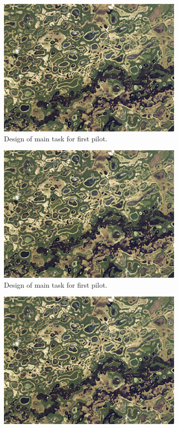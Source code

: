 \begin{figure}[!htb]
\begin{subfigure}{0.5\textwidth}
  \centering
  \includegraphics[width=.8\linewidth]{pantanal.jpeg}  
  \caption{Design of main task for first pilot.}
  \label{v2.requirement.examples.1}
\end{subfigure}
\begin{subfigure}{0.5\textwidth}
  \centering
  \includegraphics[width=.8\linewidth]{pantanal.jpeg}  
  \caption{Design of main task for first pilot.}
  \label{v2.requirement.examples.2}
\end{subfigure}
\newline
\begin{subfigure}{0.5\textwidth}
  \centering
  \includegraphics[width=.8\linewidth]{pantanal.jpeg}  

\end{subfigure}
\end{figure}
